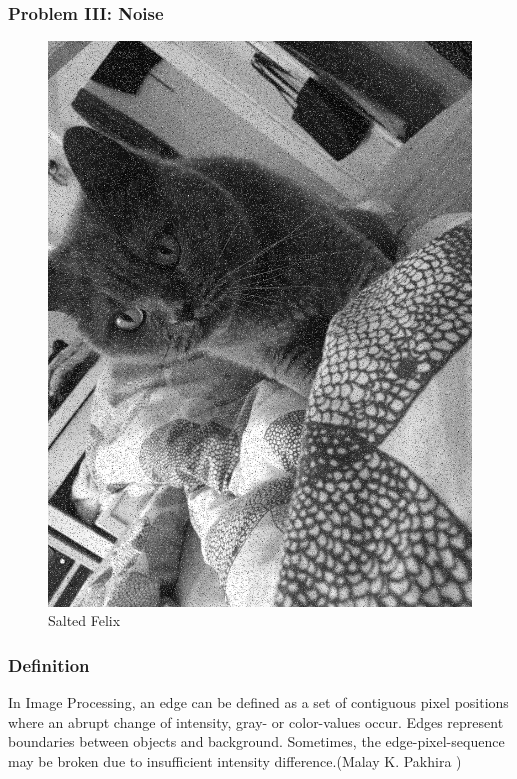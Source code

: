 \begin{frame}
	\frametitle{Problem III: Noise}
	\begin{center}
		\begin{figure}
			\centering
			\includegraphics[width=0.4\linewidth]{images/KadseSalty}
			\caption[Salted Felix]{Salted Felix}
			\label{fig:Salted}
		\end{figure}
	\end{center}
\end{frame}

\begin{frame}
	\frametitle{Definition}
	In Image Processing, an edge can be defined as a set of contiguous pixel positions where an abrupt change of intensity, gray- or color-values occur. Edges represent boundaries between objects and background. Sometimes, the edge-pixel-sequence may be broken due to insufficient intensity difference.(Malay K. Pakhira )
\end{frame}	
